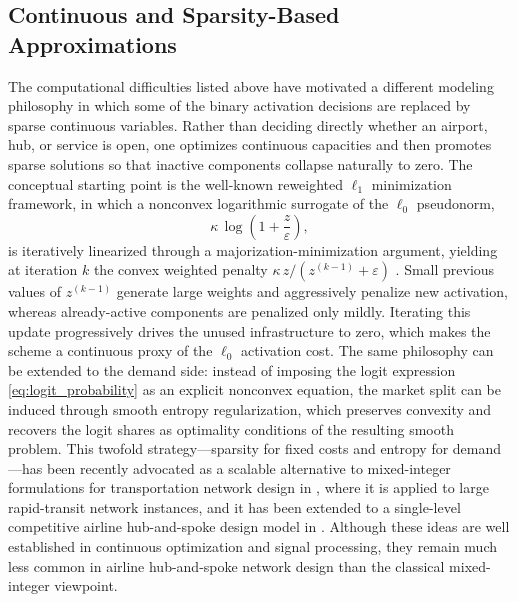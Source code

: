\subsection{Continuous and Sparsity-Based Approximations}
The computational difficulties listed above have motivated a different modeling philosophy in which some of the binary activation decisions are replaced by sparse continuous variables. Rather than deciding directly whether an airport, hub, or service is open, one optimizes continuous capacities and then promotes sparse solutions so that inactive components collapse naturally to zero. The conceptual starting point is the well-known reweighted $\ell_1$ minimization framework, in which a nonconvex logarithmic surrogate of the $\ell_0$ pseudonorm,
\begin{equation}
\kappa\,\log\!\left(1+\frac{z}{\varepsilon}\right),
\label{eq:log_surrogate_sota}
\end{equation}
is iteratively linearized through a majorization-minimization argument, yielding at iteration $k$ the convex weighted penalty $\kappa\,z\bigl/(z^{(k-1)}+\varepsilon)$ \cite{CandesWakinBoyd2008}. Small previous values of $z^{(k-1)}$ generate large weights and aggressively penalize new activation, whereas already-active components are penalized only mildly. Iterating this update progressively drives the unused infrastructure to zero, which makes the scheme a continuous proxy of the $\ell_0$ activation cost. The same philosophy can be extended to the demand side: instead of imposing the logit expression \eqref{eq:logit_probability} as an explicit nonconvex equation, the market split can be induced through smooth entropy regularization, which preserves convexity and recovers the logit shares as optimality conditions of the resulting smooth problem. This twofold strategy—sparsity for fixed costs and entropy for demand—has been recently advocated as a scalable alternative to mixed-integer formulations for transportation network design in \cite{RealRojas2026TRB}, where it is applied to large rapid-transit network instances, and it has been extended to a single-level competitive airline hub-and-spoke design model in \cite{RealRojas2025AIAA}. Although these ideas are well established in continuous optimization and signal processing, they remain much less common in airline hub-and-spoke network design than the classical mixed-integer viewpoint.

